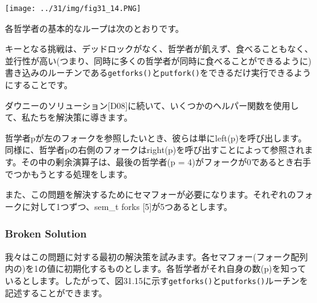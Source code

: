 \texttt{[image: ../31/img/fig31\_14.PNG]}

各哲学者の基本的なループは次のとおりです。

\begin{Shaded}
\begin{Highlighting}[]
\NormalTok{ (}\NormalTok{) \{}
\NormalTok{\}}
\end{Highlighting}
\end{Shaded}

キーとなる挑戦は、デッドロックがなく、哲学者が飢えず、食べることもなく、並行性が高い(つまり、同時に多くの哲学者が同時に食べることができるように)書き込みのルーチンである\texttt{getforks()}と\texttt{putfork()}をできるだけ実行できるようにすることです。

ダウニーのソリューション{[}D08{]}に続いて、いくつかのヘルパー関数を使用して、私たちを解決策に導きます。

\begin{Shaded}
\begin{Highlighting}[]
\NormalTok{) \% }\NormalTok{; \}}
\end{Highlighting}
\end{Shaded}

哲学者pが左のフォークを参照したいとき、彼らは単にleft(p)を呼び出します。同様に、哲学者pの右側のフォークはright(p)を呼び出すことによって参照されます。その中の剰余演算子は、最後の哲学者(p
= 4)がフォークが0であるとき右手でつかもうとする処理をします。

また、この問題を解決するためにセマフォーが必要になります。それぞれのフォークに対して1つずつ、sem\_t
forks {[}5{]}が5つあるとします。

\hypertarget{broken-solution}{%
\subsubsection*{Broken Solution}\label{broken-solution}}

我々はこの問題に対する最初の解決策を試みます。各セマフォー(フォーク配列内の)を1の値に初期化するものとします。各哲学者がそれ自身の数(p)を知っているとします。したがって、図31.15に示す\texttt{getforks()}と\texttt{putforks()}ルーチンを記述することができます。

